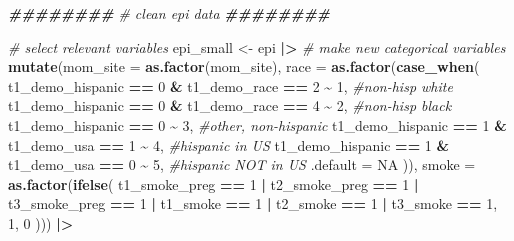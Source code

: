\documentclass[12pt, twoside]{amherstthesis}
\newenvironment{Shaded}{\begin{snugshade}}{\end{snugshade}}
\newcommand{\AttributeTok}[1]{\textcolor[rgb]{0.13,0.29,0.53}{#1}}
\newcommand{\CommentTok}[1]{\textcolor[rgb]{0.56,0.35,0.01}{\textit{#1}}}
\newcommand{\ConstantTok}[1]{\textcolor[rgb]{0.56,0.35,0.01}{#1}}
\newcommand{\DecValTok}[1]{\textcolor[rgb]{0.00,0.00,0.81}{#1}}
\newcommand{\DocumentationTok}[1]{\textcolor[rgb]{0.56,0.35,0.01}{\textbf{\textit{#1}}}}
\newcommand{\FunctionTok}[1]{\textcolor[rgb]{0.13,0.29,0.53}{\textbf{#1}}}
\newcommand{\NormalTok}[1]{#1}
\newcommand{\OtherTok}[1]{\textcolor[rgb]{0.56,0.35,0.01}{#1}}
\newcommand{\SpecialCharTok}[1]{\textcolor[rgb]{0.81,0.36,0.00}{\textbf{#1}}}
\begin{document}
\begin{Shaded}
\begin{Highlighting}[]
\DocumentationTok{\#\#\#\#\#\#\#\#}
\CommentTok{\# clean epi data}
\DocumentationTok{\#\#\#\#\#\#\#\#}

\CommentTok{\# select relevant variables}
\NormalTok{epi\_small }\OtherTok{\textless{}{-}}\NormalTok{ epi }\SpecialCharTok{|\textgreater{}} 
  \CommentTok{\# make new categorical variables}
  \FunctionTok{mutate}\NormalTok{(}\AttributeTok{mom\_site =} \FunctionTok{as.factor}\NormalTok{(mom\_site), }
         \AttributeTok{race =} \FunctionTok{as.factor}\NormalTok{(}\FunctionTok{case\_when}\NormalTok{(}
\NormalTok{           t1\_demo\_hispanic }\SpecialCharTok{==} \DecValTok{0} \SpecialCharTok{\&}\NormalTok{ t1\_demo\_race }\SpecialCharTok{==} \DecValTok{2} \SpecialCharTok{\textasciitilde{}} \DecValTok{1}\NormalTok{, }\CommentTok{\#non{-}hisp white}
\NormalTok{           t1\_demo\_hispanic }\SpecialCharTok{==} \DecValTok{0} \SpecialCharTok{\&}\NormalTok{ t1\_demo\_race }\SpecialCharTok{==} \DecValTok{4} \SpecialCharTok{\textasciitilde{}} \DecValTok{2}\NormalTok{, }\CommentTok{\#non{-}hisp black}
\NormalTok{           t1\_demo\_hispanic }\SpecialCharTok{==} \DecValTok{0} \SpecialCharTok{\textasciitilde{}} \DecValTok{3}\NormalTok{, }\CommentTok{\#other, non{-}hispanic}
\NormalTok{           t1\_demo\_hispanic }\SpecialCharTok{==} \DecValTok{1} \SpecialCharTok{\&}\NormalTok{ t1\_demo\_usa }\SpecialCharTok{==} \DecValTok{1} \SpecialCharTok{\textasciitilde{}} \DecValTok{4}\NormalTok{, }\CommentTok{\#hispanic in US}
\NormalTok{           t1\_demo\_hispanic }\SpecialCharTok{==} \DecValTok{1} \SpecialCharTok{\&}\NormalTok{ t1\_demo\_usa }\SpecialCharTok{==} \DecValTok{0} \SpecialCharTok{\textasciitilde{}} \DecValTok{5}\NormalTok{, }\CommentTok{\#hispanic NOT in US}
           \AttributeTok{.default =} \ConstantTok{NA}
\NormalTok{         )), }
         \AttributeTok{smoke =} \FunctionTok{as.factor}\NormalTok{(}\FunctionTok{ifelse}\NormalTok{(}
\NormalTok{           t1\_smoke\_preg }\SpecialCharTok{==} \DecValTok{1} \SpecialCharTok{|}\NormalTok{ t2\_smoke\_preg }\SpecialCharTok{==} \DecValTok{1} \SpecialCharTok{|}\NormalTok{ t3\_smoke\_preg }\SpecialCharTok{==} \DecValTok{1} \SpecialCharTok{|}
\NormalTok{             t1\_smoke }\SpecialCharTok{==} \DecValTok{1} \SpecialCharTok{|}\NormalTok{ t2\_smoke }\SpecialCharTok{==} \DecValTok{1} \SpecialCharTok{|}\NormalTok{ t3\_smoke }\SpecialCharTok{==} \DecValTok{1}\NormalTok{, }\DecValTok{1}\NormalTok{, }\DecValTok{0}
\NormalTok{         ))) }\SpecialCharTok{|\textgreater{}} 

\end{Highlighting}
\end{Shaded}
\end{document}
